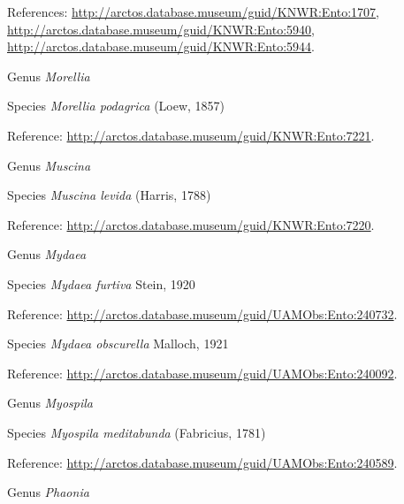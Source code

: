 \documentclass[9pt, article]{memoir}
\begin{document}
\begin{multicols}{2}
References: 
\url{http://arctos.database.museum/guid/KNWR:Ento:1707}, 
\url{http://arctos.database.museum/guid/KNWR:Ento:5940}, 
\url{http://arctos.database.museum/guid/KNWR:Ento:5944}.

\vspace{6pt}\noindent\hspace{30pt}Genus \textit{Morellia}


\vspace{6pt}\noindent\hspace{36pt}Species \textit{Morellia podagrica} (Loew, 1857)


Reference: 
\url{http://arctos.database.museum/guid/KNWR:Ento:7221}.

\vspace{6pt}\noindent\hspace{30pt}Genus \textit{Muscina}


\vspace{6pt}\noindent\hspace{36pt}Species \textit{Muscina levida} (Harris, 1788)


Reference: 
\url{http://arctos.database.museum/guid/KNWR:Ento:7220}.

\vspace{6pt}\noindent\hspace{30pt}Genus \textit{Mydaea}


\vspace{6pt}\noindent\hspace{36pt}Species \textit{Mydaea furtiva} Stein, 1920


Reference: 
\url{http://arctos.database.museum/guid/UAMObs:Ento:240732}.

\vspace{6pt}\noindent\hspace{36pt}Species \textit{Mydaea obscurella} Malloch, 1921


Reference: 
\url{http://arctos.database.museum/guid/UAMObs:Ento:240092}.

\vspace{6pt}\noindent\hspace{30pt}Genus \textit{Myospila}


\vspace{6pt}\noindent\hspace{36pt}Species \textit{Myospila meditabunda} (Fabricius, 1781)


Reference: 
\url{http://arctos.database.museum/guid/UAMObs:Ento:240589}.

\vspace{6pt}\noindent\hspace{30pt}Genus \textit{Phaonia}



\end{multicols}
\end{document}
